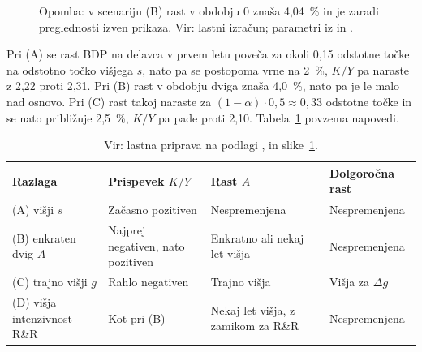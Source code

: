 \documentclass[12pt,a4paper]{article}
\begin{document}
\begin{figure}[H]
\centering
{}
\caption{Simulirana rast BDP na delavca v Solowovem modelu ob treh možnih učinkih}
\caption*{\footnotesize Opomba: v scenariju (B) rast v obdobju 0 znaša 4,04~\% in je zaradi preglednosti izven prikaza. Vir: lastni izračun; parametri iz \cite[pros.~40]{grobovsek2026} in \cite[str.~18]{polanec_rast}.}
\label{fig:simulacija}
\end{figure}

Pri (A) se rast BDP na delavca v prvem letu poveča za okoli 0,15 odstotne točke na odstotno točko višjega $s$, nato pa se postopoma vrne na 2~\%, $K/Y$ pa naraste z 2,22 proti 2,31. Pri (B) rast v obdobju dviga znaša 4,0~\%, nato pa je le malo nad osnovo. Pri (C) rast takoj naraste za $(1-\alpha)\cdot0{,}5\approx0{,}33$ odstotne točke in se nato približuje 2,5~\%, $K/Y$ pa pade proti 2,10. Tabela~\ref{tab:napovedi} povzema napovedi.

\begin{table}[H]
\centering
\caption{Napovedi za možne razlage v razčlenitvi~\eqref{eq:rast}}\label{tab:napovedi}
\small
\renewcommand{\arraystretch}{1.1}
\begin{tabularx}{\textwidth}{>{\raggedright\arraybackslash}p{4.0cm} >{\raggedright\arraybackslash}X >{\raggedright\arraybackslash}X >{\raggedright\arraybackslash}X}
\toprule
Razlaga & Prispevek $K/Y$ & Rast $A$ & Dolgoročna rast \\
\midrule
(A) višji $s$ & Začasno pozitiven & Nespremenjena & Nespremenjena \\
(B) enkraten dvig $A$ & Najprej negativen, nato pozitiven & Enkratno ali nekaj let višja & Nespremenjena \\
(C) trajno višji $g$ & Rahlo negativen & Trajno višja & Višja za $\Delta g$ \\
(D) višja intenzivnost R\&R & Kot pri (B) & Nekaj let višja, z zamikom za R\&R & Nespremenjena \\
\bottomrule
\end{tabularx}
\caption*{\footnotesize Vir: lastna priprava na podlagi \cite[pros.~45--48,~59--61,~136]{grobovsek2026}, \cite{jones1995} in slike~\ref{fig:simulacija}.}
\end{table}
\end{document}
